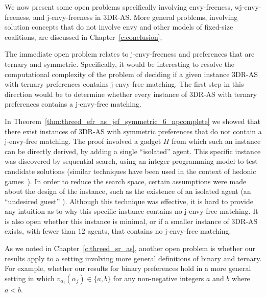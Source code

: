 We now present some open problems specifically involving envy-freeness, wj-envy-freeness, and j-envy-freeness in 3DR-AS. More general problems, involving solution concepts that do not involve envy and other models of fixed-size coalitions, are discussed in Chapter~\ref{c:conclusion}.

The immediate open problem relates to j-envy-freeness and preferences that are ternary and symmetric. Specifically, it would be interesting to resolve the computational complexity of the problem of deciding if a given instance 3DR-AS with ternary preferences contains j-envy-free matching. The first step in this direction would be to determine whether every instance of 3DR-AS with ternary preferences contains a j-envy-free matching. 

In Theorem~\ref{thm:threed_efr_as_jef_symmetric_6_npcomplete} we showed that there exist instances of 3DR-AS with symmetric preferences that do not contain a j-envy-free matching. The proof involved a gadget $H$ from which such an instance can be directly derived, by adding a single ``isolated'' agent. This specific instance was discovered by sequential search, using an integer programming \cite{IPbook} model to test candidate solutions (similar techniques have been used in the context of hedonic games~\cite{bullinger21}). In order to reduce the search space, certain assumptions were made about the design of the instance, such as the existence of an isolated agent (an ``undesired guest'' \cite{BJ02,GS62}). Although this technique was effective, it is hard to provide any intuition as to why this specific instance contains no j-envy-free matching. It is also open whether this instance is minimal, or if a smaller instance of 3DR-AS exists, with fewer than $12$ agents, that contains no j-envy-free matching. 

As we noted in Chapter~\ref{c:threed_sr_as}, another open problem is whether our results apply to a setting involving more general definitions of binary and ternary. For example, whether our results for binary preferences hold in a more general setting in which $v_{\alpha_i}(\alpha_j) \in \{ a, b \}$ for any non-negative integers $a$ and $b$ where $a < b$.


